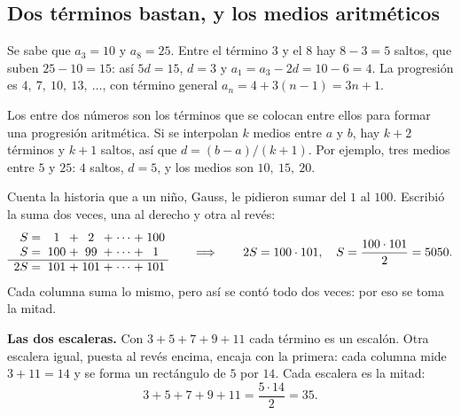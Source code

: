 \documentclass[11pt,a4paper]{article}
\begin{document}
\subsection{Dos términos bastan, y los medios aritméticos}
\begin{ejemplo}
Se sabe que $a_3=10$ y $a_8=25$. Entre el término $3$ y el $8$ hay $8-3=5$ saltos, que suben $25-10=15$: así
$5d=15$, $d=3$ y $a_1=a_3-2d=10-6=4$. La progresión es $4,\ 7,\ 10,\ 13,\ \dots$, con término general $a_n=4+3(n-1)=3n+1$.
\end{ejemplo}
\begin{definicion}
Los  entre dos números son los términos que se colocan entre ellos para formar una
progresión aritmética. Si se interpolan $k$ medios entre $a$ y $b$, hay $k+2$ términos y $k+1$ saltos, así que
$d=(b-a)/(k+1)$. Por ejemplo, tres medios entre $5$ y $25$: $4$ saltos, $d=5$, y los medios son $10,\ 15,\ 20$.
\end{definicion}


Cuenta la historia que a un niño, Gauss, le pidieron sumar del $1$ al $100$. Escribió la suma dos veces, una al
derecho y otra al revés:
\[
\begin{array}{r@{\;}c@{\;}c@{\;}c@{\;}c@{\;}c@{\;}c@{\;}c@{\;}c}
S={} & 1 &+& 2 &+& \cdots &+& 100\\
S={} & 100 &+& 99 &+& \cdots &+& 1\\ \hline
2S={} & 101 &+& 101 &+& \cdots &+& 101
\end{array}
\qquad\Longrightarrow\qquad 2S=100\cdot 101,\quad S=\frac{100\cdot101}{2}=5050 .
\]
Cada columna suma lo mismo, pero así se contó todo dos veces: por eso se toma la mitad.

\begin{minipage}[c]{0.5\linewidth}
\textbf{Las dos escaleras.} Con $3+5+7+9+11$ cada término es un escalón. Otra escalera igual, puesta al revés
encima, encaja con la primera: cada columna mide $3+11=14$ y se forma un rectángulo de $5$ por $14$. Cada escalera
es la mitad:
\[ 3+5+7+9+11=\frac{5\cdot 14}{2}=35 . \]
\end{minipage}\hfill
\begin{minipage}[c]{0.44\linewidth}\centering
{}
\end{minipage}
\end{document}
